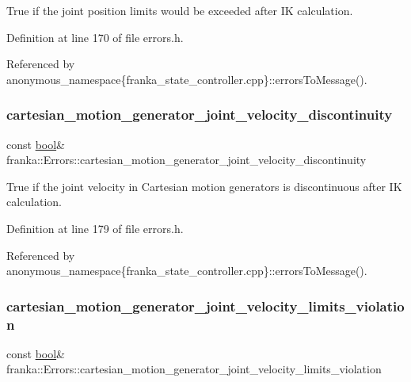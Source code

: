 True if the joint position limits would be exceeded after IK calculation. 

Definition at line 170 of file errors.\+h.



Referenced by anonymous\+\_\+namespace\{franka\+\_\+state\+\_\+controller.\+cpp\}\+::errors\+To\+Message().

\mbox{\label{structfranka_1_1Errors_a1c8c56766fefc19fda5d5de909ca5b37}} 
\subsubsection{\texorpdfstring{cartesian\+\_\+motion\+\_\+generator\+\_\+joint\+\_\+velocity\+\_\+discontinuity}{cartesian\_motion\_generator\_joint\_velocity\_discontinuity}}
{\footnotesize\ttfamily const \hyperlink{classbool}{bool}\& franka\+::\+Errors\+::cartesian\+\_\+motion\+\_\+generator\+\_\+joint\+\_\+velocity\+\_\+discontinuity}

True if the joint velocity in Cartesian motion generators is discontinuous after IK calculation. 

Definition at line 179 of file errors.\+h.



Referenced by anonymous\+\_\+namespace\{franka\+\_\+state\+\_\+controller.\+cpp\}\+::errors\+To\+Message().

\mbox{\label{structfranka_1_1Errors_a435d16d62a123bfbf578bc76e3780605}} 
\subsubsection{\texorpdfstring{cartesian\+\_\+motion\+\_\+generator\+\_\+joint\+\_\+velocity\+\_\+limits\+\_\+violation}{cartesian\_motion\_generator\_joint\_velocity\_limits\_violation}}
{\footnotesize\ttfamily const \hyperlink{classbool}{bool}\& franka\+::\+Errors\+::cartesian\+\_\+motion\+\_\+generator\+\_\+joint\+\_\+velocity\+\_\+limits\+\_\+violation}

